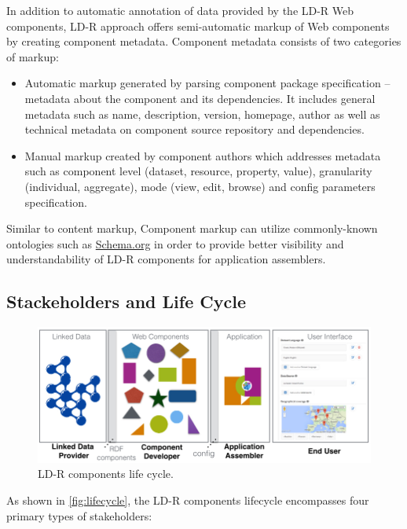 \documentclass{acm_proc_article-sp}
\begin{document}
In addition to automatic annotation of data provided by the LD-R Web components, LD-R approach offers semi-automatic markup of Web components by creating component metadata. 
Component metadata consists of two categories of markup:
\begin{itemize}
\item Automatic markup generated by parsing component package specification -- metadata about the component and its dependencies. It includes general metadata such as name, description, version, homepage, author as well as technical metadata on component source repository and dependencies.

\item Manual markup created by component authors which addresses metadata such as component level (dataset, resource, property, value), granularity (individual, aggregate), mode (view, edit, browse) and config parameters specification.

\end{itemize}

Similar to content markup, Component markup can utilize commonly-known ontologies such as \url{Schema.org} in order to provide better visibility and understandability of LD-R components for application assemblers.

\subsection{Stackeholders and Life Cycle}
\begin{figure}[tb]
  \includegraphics[width=1\linewidth]{images/lifecycle.jpg}
  \caption{LD-R components life cycle.}
  \label{fig:lifecycle}
\end{figure}

As shown in \autoref{fig:lifecycle}, the LD-R components lifecycle encompasses four primary types of stakeholders:
\end{document}
